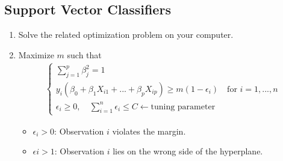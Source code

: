 \documentclass[12pt, letterpaper]{article}
\begin{document}
\subsection{Support Vector Classifiers}
\begin{enumerate}
    \item Solve the related optimization problem on your computer.
    \item Maximize $m$ such that 
    \begin{align*}
        \begin{cases}
            \sum_{j=1}^{p} \beta^2_j = 1 \\
            y_i ( \beta_0 + \beta_1 X_{i1} + ... + \beta_p X_{ip}) \ge m(1-\epsilon_i) \quad \text{for } i = 1,...,n\\
            \epsilon_i \ge 0,\quad \sum_{i=1}^{n} \epsilon_i \le C \leftarrow \text{tuning parameter}
        \end{cases}
    \end{align*}
    \begin{itemize}
    \item $\epsilon_i > 0$: Observation $i$ violates the margin.
    \item $\epsilon i > 1$: Observation $i$ lies on the wrong side of the hyperplane.
\end{itemize}
\end{enumerate}
\end{document}
